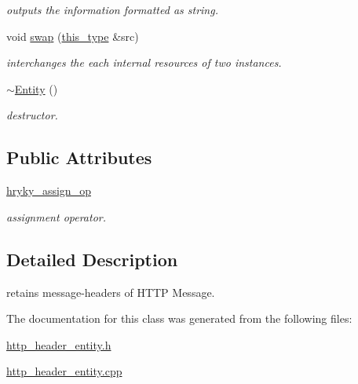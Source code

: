 \begin{DoxyCompactItemize}
\begin{DoxyCompactList}\small\item\em outputs the information formatted as string. \end{DoxyCompactList}\item 
\hypertarget{classhryky_1_1http_1_1header_1_1_entity_a23f9e53b5b6cf14c08c73fa558b079bc}{void \hyperlink{classhryky_1_1http_1_1header_1_1_entity_a23f9e53b5b6cf14c08c73fa558b079bc}{swap} (\hyperlink{classhryky_1_1http_1_1header_1_1_entity_a2d6b33008fa9a1607970c743ee7ee545}{this\-\_\-type} \&src)}\label{classhryky_1_1http_1_1header_1_1_entity_a23f9e53b5b6cf14c08c73fa558b079bc}

\begin{DoxyCompactList}\small\item\em interchanges the each internal resources of two instances. \end{DoxyCompactList}\item 
\hypertarget{classhryky_1_1http_1_1header_1_1_entity_af7864f6c99d70b22399886c46553d723}{\hyperlink{classhryky_1_1http_1_1header_1_1_entity_af7864f6c99d70b22399886c46553d723}{$\sim$\-Entity} ()}\label{classhryky_1_1http_1_1header_1_1_entity_af7864f6c99d70b22399886c46553d723}

\begin{DoxyCompactList}\small\item\em destructor. \end{DoxyCompactList}\end{DoxyCompactItemize}
\subsection*{Public Attributes}
\begin{DoxyCompactItemize}
\item 
\hypertarget{classhryky_1_1http_1_1header_1_1_entity_aa78de366fe97ed34a4dd2bfb44f4ca43}{\hyperlink{classhryky_1_1http_1_1header_1_1_entity_aa78de366fe97ed34a4dd2bfb44f4ca43}{hryky\-\_\-assign\-\_\-op}}\label{classhryky_1_1http_1_1header_1_1_entity_aa78de366fe97ed34a4dd2bfb44f4ca43}

\begin{DoxyCompactList}\small\item\em assignment operator. \end{DoxyCompactList}\end{DoxyCompactItemize}


\subsection{Detailed Description}
retains message-\/headers of H\-T\-T\-P Message. 

The documentation for this class was generated from the following files\-:\begin{DoxyCompactItemize}
\item 
\hyperlink{http__header__entity_8h}{http\-\_\-header\-\_\-entity.\-h}\item 
\hyperlink{http__header__entity_8cpp}{http\-\_\-header\-\_\-entity.\-cpp}\end{DoxyCompactItemize}
